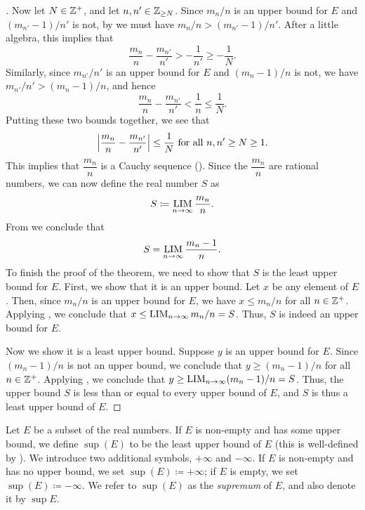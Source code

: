 \begin{proof}[]
  Now let \(N \in \mathbb{Z}^+\), and let \(n, n' \in \mathbb{Z}_{\geq N}\).
  Since \(m_n / n\) is an upper bound for \(E\) and \((m_{n'} - 1) / n'\) is not, by  we must have \(m_n / n > (m_{n'} - 1) / n'\).
  After a little algebra, this implies that
  \[
    \dfrac{m_n}{n} - \dfrac{m_{n'}}{n'} > -\dfrac{1}{n'} \geq -\dfrac{1}{N}.
  \]
  Similarly, since \(m_{n'} / n'\) is an upper bound for \(E\) and \((m_n - 1) / n\) is not, we have \(m_{n'} / n' > (m_n - 1) / n\), and hence
  \[
    \dfrac{m_n}{n} - \dfrac{m_{n'}}{n'} < \dfrac{1}{n} \leq \dfrac{1}{N}.
  \]
  Putting these two bounds together, we see that
  \[
    \left\lvert\dfrac{m_n}{n} - \dfrac{m_{n'}}{n'}\right\rvert \leq \dfrac{1}{N} \text{ for all } n, n' \geq N \geq 1.
  \]
  This implies that \(\dfrac{m_n}{n}\) is a Cauchy sequence ().
  Since the \(\dfrac{m_n}{n}\) are rational numbers, we can now define the real number \(S\) as
  \[
    S \coloneqq \operatorname*{LIM}_{n \to \infty} \dfrac{m_n}{n}.
  \]
  From  we conclude that
  \[
    S = \operatorname*{LIM}_{n \to \infty} \dfrac{m_n - 1}{n}.
  \]
  To finish the proof of the theorem, we need to show that \(S\) is the least upper bound for \(E\).
  First, we show that it is an upper bound.
  Let \(x\) be any element of \(E\).
  Then, since \(m_n / n\) is an upper bound for \(E\), we have \(x \leq m_n / n\) for all \(n \in \mathbb{Z}^+\).
  Applying , we conclude that \(x \leq \operatorname*{LIM}_{n \to \infty} m_n / n = S\).
  Thus, \(S\) is indeed an upper bound for \(E\).

  Now we show it is a least upper bound.
  Suppose \(y\) is an upper bound for \(E\).
  Since \((m_n - 1) / n\) is not an upper bound, we conclude that \(y \geq (m_n - 1) / n\) for all \(n \in \mathbb{Z}^+\).
  Applying , we conclude that \(y \geq \operatorname*{LIM}_{n \to \infty} (m_n - 1) / n = S\).
  Thus, the upper bound \(S\) is less than or equal to every upper bound of \(E\), and \(S\) is thus a least upper bound of \(E\).
\end{proof}

\begin{defn}[Supremum]\label{i:5.5.10}
  Let \(E\) be a subset of the real numbers.
  If \(E\) is non-empty and has some upper bound, we define \(\sup(E)\) to be the least upper bound of \(E\)
  (this is well-defined by ).
  We introduce two additional symbols, \(+\infty\) and \(-\infty\).
  If \(E\) is non-empty and has no upper bound, we set \(\sup(E) \coloneqq +\infty\);
  if \(E\) is empty, we set \(\sup(E) \coloneqq -\infty\).
  We refer to \(\sup(E)\) as the \emph{supremum} of \(E\), and also denote it by \(\sup E\).
\end{defn}

